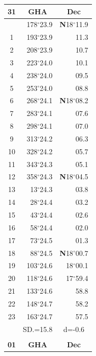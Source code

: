 \documentclass[10pt, a4paper]{report}
\begin{document}
\begin{scriptsize}
\noindent
\begin{tabular*}{0.2\textwidth}[t]{@{\extracolsep{\fill}}|c|rr|}
\hline
\multicolumn{1}{|c|}{\rule{0pt}{2.6ex}\textbf{31}} & \multicolumn{1}{c}{\textbf{GHA}} & \multicolumn{1}{c|}{\textbf{Dec}}\\
\hline\rule{0pt}{2.6ex}\noindent
0 & 178$^\circ$23.9 & \textbf{N}18$^\circ$11.9\\
1 & 193$^\circ$23.9 & 11.3\\
2 & 208$^\circ$23.9 & 10.7\\
3 & 223$^\circ$24.0 & \raisebox{0.24ex}{\boldmath$\cdot$~\boldmath$\cdot$~~}10.1\\
4 & 238$^\circ$24.0 & 09.5\\
5 & 253$^\circ$24.0 & 08.8\\[2Pt]
6 & 268$^\circ$24.1 & \textbf{N}18$^\circ$08.2\\
7 & 283$^\circ$24.1 & 07.6\\
8 & 298$^\circ$24.1 & 07.0\\
9 & 313$^\circ$24.2 & \raisebox{0.24ex}{\boldmath$\cdot$~\boldmath$\cdot$~~}06.3\\
10 & 328$^\circ$24.2 & 05.7\\
11 & 343$^\circ$24.3 & 05.1\\[2Pt]
12 & 358$^\circ$24.3 & \textbf{N}18$^\circ$04.5\\
13 & 13$^\circ$24.3 & 03.8\\
14 & 28$^\circ$24.4 & 03.2\\
15 & 43$^\circ$24.4 & \raisebox{0.24ex}{\boldmath$\cdot$~\boldmath$\cdot$~~}02.6\\
16 & 58$^\circ$24.4 & 02.0\\
17 & 73$^\circ$24.5 & 01.3\\[2Pt]
18 & 88$^\circ$24.5 & \textbf{N}18$^\circ$00.7\\
19 & 103$^\circ$24.6 & 18$^\circ$00.1\\
20 & 118$^\circ$24.6 & 17$^\circ$59.4\\
21 & 133$^\circ$24.6 & \raisebox{0.24ex}{\boldmath$\cdot$~\boldmath$\cdot$~~}58.8\\
22 & 148$^\circ$24.7 & 58.2\\
23 & 163$^\circ$24.7 & 57.5\\
\hline
\rule{0pt}{2.4ex} & \multicolumn{1}{c}{SD.=15.8} & \multicolumn{1}{c|}{d=-0.6}\\
\hline
\multicolumn{1}{c}{}\\[-0.5ex]\hline
\multicolumn{1}{|c|}{\rule{0pt}{2.6ex}\textbf{01}} & \multicolumn{1}{c}{\textbf{GHA}} & \multicolumn{1}{c|}{\textbf{Dec}}\\

\end{tabular*}
\end{scriptsize}
\end{document}
